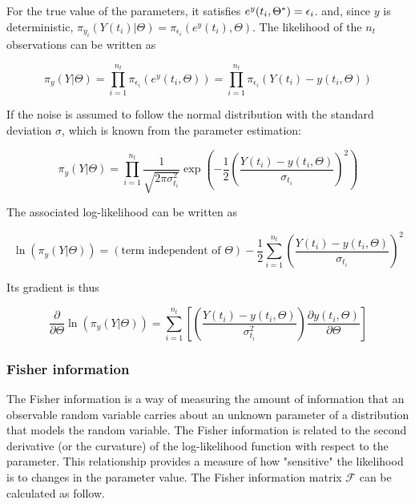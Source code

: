 \documentclass[../Article_Design_of_Experiment.tex]{subfiles}
\begin{document}
	For the true value of the parameters, it satisfies $e^y(t_i, \Theta^*)\\=\epsilon_i$. and, since $y$ is deterministic, $\pi_{y_i} (Y(t_i)|\Theta) = \pi_{\epsilon_i} (e^y(t_i),\Theta)$. The likelihood of the $n_t$ observations can be written as
	
	{\footnotesize
	\begin{equation}
		\pi_y (Y|\Theta) = \prod_{i=1}^{n_t} \pi_{\epsilon_i}(e^y(t_i,\Theta)) =  \prod_{i=1}^{n_t} \pi_{\epsilon_i}(Y(t_i) - y(t_i, \Theta))
	\end{equation} }
	
	If the noise is assumed to follow the normal distribution with the standard deviation $\sigma$, which is known from the parameter estimation:
	
	{\footnotesize
	\begin{equation}
		\pi_y (Y|\Theta) = \prod_{i=1}^{n_t} \frac{1}{ \sqrt{2\pi\sigma_{t_i}^2} } \exp \left( -\frac{1}{2} \left( \frac{Y(t_i) - y(t_i, \Theta)}{\sigma_{t_i}} \right)^2 \right)
	\end{equation} }
	
	The associated log-likelihood can be written as
	
	{\footnotesize
	\begin{equation}
		\ln (\pi_y (Y|\Theta)) = (\text{term independent of } \Theta) - \frac{1}{2} \sum_{i=1}^{n_t}  \left( \frac{Y(t_i) - y(t_i, \Theta)}{\sigma_{t_i}} \right)^2
	\end{equation} }
	
	Its gradient is thus
	
	{\footnotesize
	\begin{equation}
		\frac{\partial}{\partial \Theta} \ln (\pi_y (Y|\Theta)) =  \sum_{i=1}^{n_t}  \left[ \left( \frac{Y(t_i) - y(t_i, \Theta)}{\sigma_{t_i}^2} \right) \frac{\partial y(t_i, \Theta)}{\partial \Theta} \right]
	\end{equation} }
	
	\subsubsection{Fisher information}
	
	The Fisher information is a way of measuring the amount of information that an observable random variable carries about an unknown parameter of a distribution that models the random variable. The Fisher information is related to the second derivative (or the curvature) of the log-likelihood function with respect to the parameter. This relationship provides a measure of how "sensitive" the likelihood is to changes in the parameter value. The Fisher information matrix $\mathcal{F}$ can be calculated as follow.
	
\end{document}
